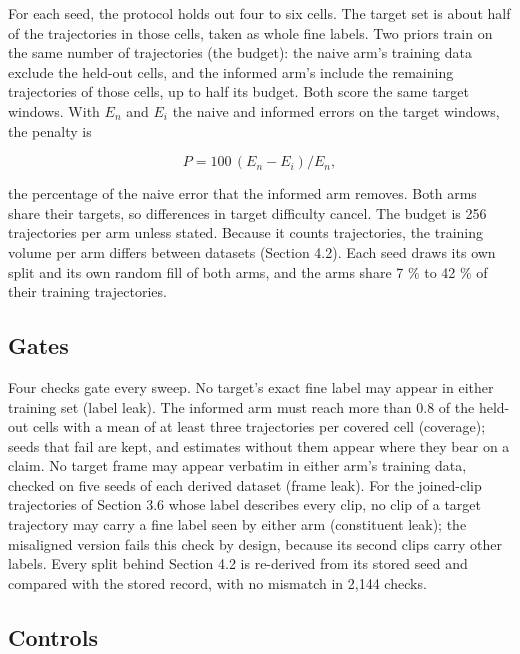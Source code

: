 \documentclass[10pt]{article}
\begin{document}
For each seed, the protocol holds out four to six cells. The target set is about half of the trajectories in those cells, taken as whole fine labels. Two priors train on the same number of trajectories (the budget): the naive arm's training data exclude the held-out cells, and the informed arm's include the remaining trajectories of those cells, up to half its budget. Both score the same target windows. With $E_n$ and $E_i$ the naive and informed errors on the target windows, the penalty is

\begin{equation}
P = 100\,(E_n - E_i)/E_n,
\label{eq:penalty}
\end{equation}

the percentage of the naive error that the informed arm removes. Both arms share their targets, so differences in target difficulty cancel. The budget is 256 trajectories per arm unless stated. Because it counts trajectories, the training volume per arm differs between datasets (Section 4.2). Each seed draws its own split and its own random fill of both arms, and the arms share 7 \% to 42 \% of their training trajectories.

\subsection{Gates}

Four checks gate every sweep. No target's exact fine label may appear in either training set (label leak). The informed arm must reach more than 0.8 of the held-out cells with a mean of at least three trajectories per covered cell (coverage); seeds that fail are kept, and estimates without them appear where they bear on a claim. No target frame may appear verbatim in either arm's training data, checked on five seeds of each derived dataset (frame leak). For the joined-clip trajectories of Section 3.6 whose label describes every clip, no clip of a target trajectory may carry a fine label seen by either arm (constituent leak); the misaligned version fails this check by design, because its second clips carry other labels. Every split behind Section 4.2 is re-derived from its stored seed and compared with the stored record, with no mismatch in 2,144 checks.

\subsection{Controls}
\end{document}
